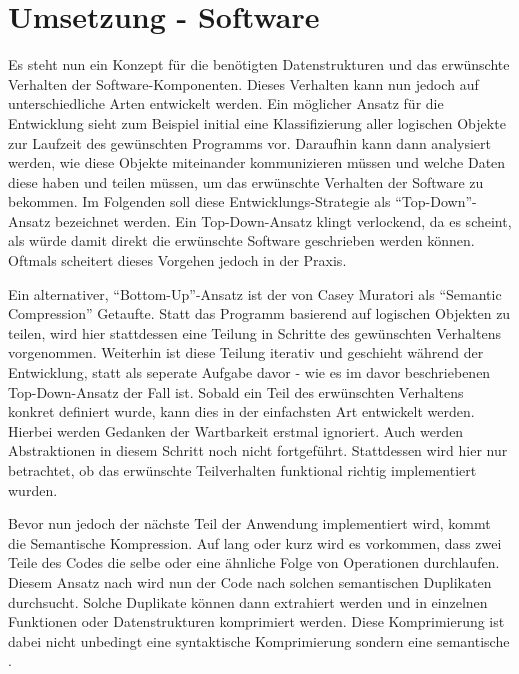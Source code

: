
\chapter{Umsetzung - Software} \label{umsetzungSW}

\nocite{*}

Es steht nun ein Konzept für die benötigten Datenstrukturen und das erwünschte Verhalten der Software-Komponenten.
Dieses Verhalten kann nun jedoch auf unterschiedliche Arten entwickelt werden.
Ein möglicher Ansatz für die Entwicklung sieht zum Beispiel initial eine Klassifizierung aller logischen Objekte zur Laufzeit des gewünschten Programms vor.
Daraufhin kann dann analysiert werden, wie diese Objekte miteinander kommunizieren müssen und welche Daten diese haben und teilen müssen, um das erwünschte Verhalten der Software zu bekommen.
Im Folgenden soll diese Entwicklungs-Strategie als \enquote{Top-Down}-Ansatz bezeichnet werden.
Ein Top-Down-Ansatz klingt verlockend, da es scheint, als würde damit direkt die erwünschte Software geschrieben werden können.
Oftmals scheitert dieses Vorgehen jedoch in der Praxis. %

Ein alternativer, \enquote{Bottom-Up}-Ansatz ist der von Casey Muratori als \enquote{Semantic Compression} \cite{mur.SemanticCompression.14} Getaufte.
Statt das Programm basierend auf logischen Objekten zu teilen, wird hier stattdessen eine Teilung in Schritte des gewünschten Verhaltens vorgenommen.
Weiterhin ist diese Teilung iterativ und geschieht während der Entwicklung, statt als seperate Aufgabe davor - wie es im davor beschriebenen Top-Down-Ansatz der Fall ist.
Sobald ein Teil des erwünschten Verhaltens konkret definiert wurde, kann dies in der einfachsten Art entwickelt werden.
Hierbei werden Gedanken der Wartbarkeit erstmal ignoriert.
Auch werden Abstraktionen in diesem Schritt noch nicht fortgeführt.
Stattdessen wird hier nur betrachtet, ob das erwünschte Teilverhalten funktional richtig implementiert wurden.

Bevor nun jedoch der nächste Teil der Anwendung implementiert wird, kommt die Semantische Kompression.
Auf lang oder kurz wird es vorkommen, dass zwei Teile des Codes die selbe oder eine ähnliche Folge von Operationen durchlaufen.
Diesem Ansatz nach wird nun der Code nach solchen semantischen Duplikaten durchsucht.
Solche Duplikate können dann extrahiert werden und in einzelnen Funktionen oder Datenstrukturen komprimiert werden.
Diese Komprimierung ist dabei nicht unbedingt eine syntaktische Komprimierung sondern eine semantische \cite[vgl. ]{mur.SemanticCompression.14}.


